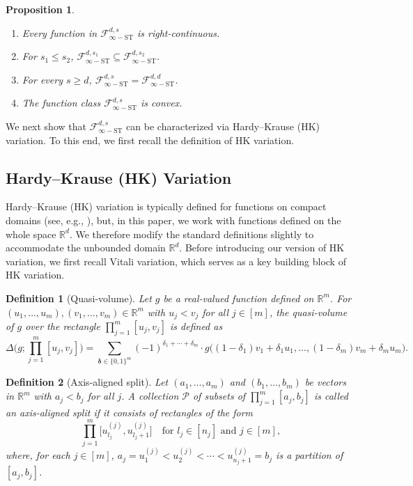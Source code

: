 \documentclass[10pt]{article}
\newtheorem{proposition}{Proposition}
\newtheorem{definition}{Definition}
\newcommand{\F}{{\mathcal{F}}}
\newcommand{\R}{{\mathbb R}}
\newcommand{\fstinf}{{\mathcal{F}^{d, s}_{\infty-\text{ST}}}}
\newcommand{\deltabf}{{\boldsymbol{\delta}}}
\begin{document}
\begin{proposition}\label{prop:fstinf-stabilization}
\begin{enumerate}[label = (\alph*)]
    \item Every function in $\fstinf$ is right-continuous.
    \item For $s_1 \le s_2$, 
    $\F^{d, s_1}_{\infty-\text{ST}} 
    \subseteq \F^{d, s_2}_{\infty-\text{ST}}$.
    \item For every $s \ge d$, 
    $\F^{d, s}_{\infty-\text{ST}} 
    = \F^{d, d}_{\infty-\text{ST}}$.
    \item The function class $\fstinf$ is convex.
\end{enumerate}
\end{proposition}

We next show that $\fstinf$ can be characterized via 
Hardy–Krause (HK) variation. To this end, we first recall the 
definition of HK variation.


\subsection{Hardy–Krause (HK) Variation}
\label{sec:hk-variation}

Hardy–Krause (HK) variation is typically defined for functions on 
compact domains (see, e.g., \citet{leonov1996total, 
owen2005multidimensional, aistleitner2015functions}), but, in this 
paper, we work with functions defined on the whole space $\R^d$. 
We therefore modify the standard definitions slightly to 
accommodate the unbounded domain $\R^d$. Before introducing our 
version of HK variation, we first recall Vitali variation, which 
serves as a key building block of HK variation.

\begin{definition}[Quasi-volume]
Let $g$ be a real-valued function defined on $\R^m$. For 
$(u_1, \dots, u_m), (v_1, \dots, v_m) \in \R^m$ with 
$u_j < v_j$ for all $j \in [m]$, the quasi-volume of $g$ over the 
rectangle $\prod_{j = 1}^{m} [u_j, v_j]$ is defined as
\begin{equation*}
    \Delta \Big(g; \prod_{j = 1}^{m} [u_j, v_j]\Big) 
    = \sum_{\deltabf \in \{0, 1\}^m}
    (-1)^{\delta_1 + \cdots + \delta_m} \cdot 
    g\big((1 - \delta_1)v_1 + \delta_1 u_1, \dots, 
    (1 - \delta_m)v_m + \delta_m u_m\big).
\end{equation*}  
\end{definition}

\begin{definition}[Axis-aligned split]
Let $(a_1, \dots, a_m)$ and $(b_1, \dots, b_m)$ be vectors in $\R^m$ 
with $a_j < b_j$ for all $j$. A collection $\mathcal{P}$ of subsets 
of $\prod_{j = 1}^{m} [a_j, b_j]$ is called an axis-aligned split if 
it consists of rectangles of the form 
\begin{equation*}
    \prod_{j = 1}^{m}\big[u^{(j)}_{l_j}, u^{(j)}_{l_j + 1}\big] 
    \quad \text{for } l_j \in [n_j] \text{ and } j \in [m],
\end{equation*} 
where, for each $j \in [m]$, 
$a_j = u^{(j)}_1 < u^{(j)}_2 < \cdots < u^{(j)}_{n_j + 1} = b_j$ 
is a partition of $[a_j, b_j]$.  
\end{definition}
\end{document}
